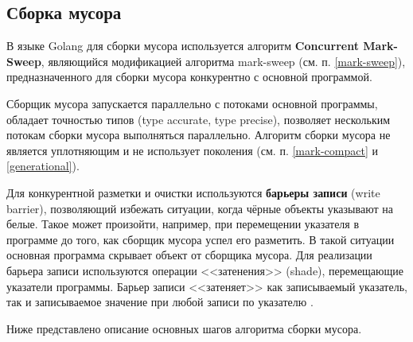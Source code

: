 \subsection{Сборка мусора}

В языке Golang для сборки мусора используется алгоритм \textbf{Concurrent Mark-Sweep}, являющийся модификацией алгоритма mark-sweep (см. п. \ref{mark-sweep}), предназначенного для сборки мусора конкурентно с основной программой. \cite{golang_gc}

Сборщик мусора запускается параллельно с потоками основной программы, обладает точностью типов (type accurate, type precise), позволяет нескольким потокам сборки мусора выполняться параллельно. Алгоритм сборки мусора не является уплотняющим и не использует поколения (см. п. \ref{mark-compact} и \ref{generational}). \cite{golang_gc}

Для конкурентной разметки и очистки используются \textbf{барьеры записи} (write barrier), позволяющий избежать ситуации, когда чёрные объекты указывают на белые. Такое может произойти, например, при перемещении указателя в программе до того, как сборщик мусора успел его разметить. В такой ситуации основная программа скрывает объект от сборщика мусора. \cite{golang_gc} Для реализации барьера записи используются операции <<затенения>> (shade), перемещающие указатели программы. Барьер записи <<затеняет>> как записываемый указатель, так и записываемое значение при любой записи по указателю \cite{golang_barrier}. 

Ниже представлено описание основных шагов алгоритма сборки мусора.~\cite{golang_gc}

